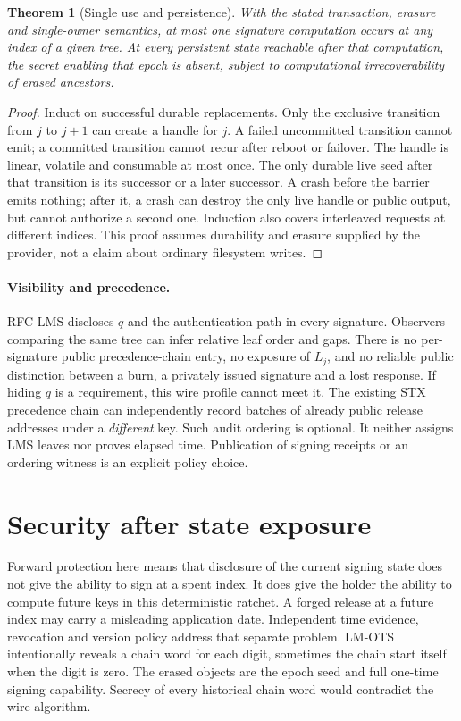 \documentclass[10pt,twocolumn,letterpaper]{article}
\newtheorem{thm}{Theorem}
\begin{document}
\begin{thm}[Single use and persistence]
With the stated transaction, erasure and single-owner semantics, at most one signature computation occurs at any index of a given tree. At every persistent state reachable after that computation, the secret enabling that epoch is absent, subject to computational irrecoverability of erased ancestors.
\end{thm}
\begin{proof}
Induct on successful durable replacements. Only the exclusive transition from $j$ to $j+1$ can create a handle for $j$. A failed uncommitted transition cannot emit; a committed transition cannot recur after reboot or failover. The handle is linear, volatile and consumable at most once. The only durable live seed after that transition is its successor or a later successor. A crash before the barrier emits nothing; after it, a crash can destroy the only live handle or public output, but cannot authorize a second one. Induction also covers interleaved requests at different indices. This proof assumes durability and erasure supplied by the provider, not a claim about ordinary filesystem writes.
\end{proof}

\paragraph{Visibility and precedence.}
RFC LMS discloses $q$ and the authentication path in every signature. Observers comparing the same tree can infer relative leaf order and gaps. There is no per-signature public precedence-chain entry, no exposure of $L_j$, and no reliable public distinction between a burn, a privately issued signature and a lost response. If hiding $q$ is a requirement, this wire profile cannot meet it. The existing STX precedence chain can independently record batches of already public release addresses under a \emph{different} key. Such audit ordering is optional. It neither assigns LMS leaves nor proves elapsed time. Publication of signing receipts or an ordering witness is an explicit policy choice.

\section{Security after state exposure}
Forward protection here means that disclosure of the current signing state does not give the ability to sign at a spent index. It does give the holder the ability to compute future keys in this deterministic ratchet. A forged release at a future index may carry a misleading application date. Independent time evidence, revocation and version policy address that separate problem. LM-OTS intentionally reveals a chain word for each digit, sometimes the chain start itself when the digit is zero. The erased objects are the epoch seed and full one-time signing capability. Secrecy of every historical chain word would contradict the wire algorithm.
\end{document}
